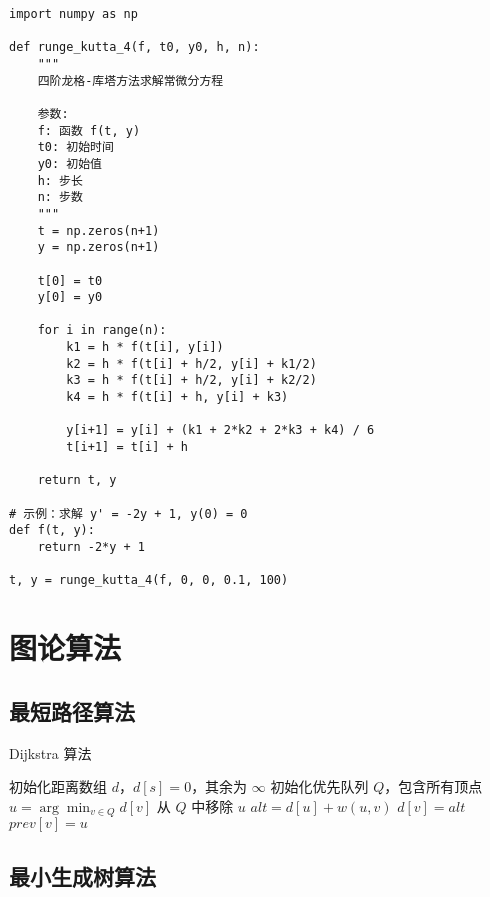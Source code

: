 \begin{codebox}[title=四阶龙格-库塔方法]
\begin{verbatim}
import numpy as np

def runge_kutta_4(f, t0, y0, h, n):
    """
    四阶龙格-库塔方法求解常微分方程
    
    参数:
    f: 函数 f(t, y)
    t0: 初始时间
    y0: 初始值
    h: 步长
    n: 步数
    """
    t = np.zeros(n+1)
    y = np.zeros(n+1)
    
    t[0] = t0
    y[0] = y0
    
    for i in range(n):
        k1 = h * f(t[i], y[i])
        k2 = h * f(t[i] + h/2, y[i] + k1/2)
        k3 = h * f(t[i] + h/2, y[i] + k2/2)
        k4 = h * f(t[i] + h, y[i] + k3)
        
        y[i+1] = y[i] + (k1 + 2*k2 + 2*k3 + k4) / 6
        t[i+1] = t[i] + h
    
    return t, y

# 示例：求解 y' = -2y + 1, y(0) = 0
def f(t, y):
    return -2*y + 1

t, y = runge_kutta_4(f, 0, 0, 0.1, 100)
\end{verbatim}
\end{codebox}

\section{图论算法}\label{app:graph-algorithms}

\subsection{最短路径算法}

\begin{algorithm}[H]
\caption{Dijkstra 算法}\label{alg:dijkstra}
\begin{algorithmic}[1]
\State 初始化距离数组 $d$，$d[s] = 0$，其余为 $\infty$
\State 初始化优先队列 $Q$，包含所有顶点
    \State $u = \arg\min_{v \in Q} d[v]$
    \State 从 $Q$ 中移除 $u$
        \State $alt = d[u] + w(u, v)$
            \State $d[v] = alt$
            \State $prev[v] = u$
        \EndIf
    \EndFor
\EndWhile
\end{algorithmic}
\end{algorithm}

\subsection{最小生成树算法}

